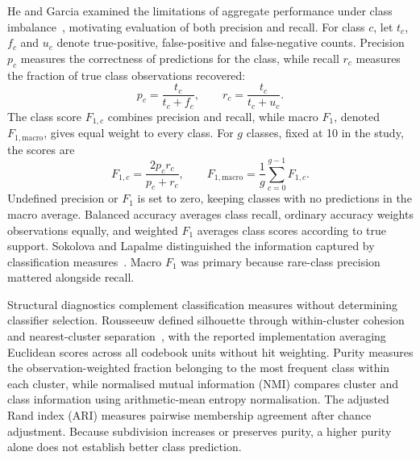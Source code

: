 He and Garcia examined the limitations of aggregate performance under class imbalance~\cite{he2009}, motivating evaluation of both precision and recall. For class $c$, let $t_c$, $f_c$ and $u_c$ denote true-positive, false-positive and false-negative counts. Precision $p_c$ measures the correctness of predictions for the class, while recall $r_c$ measures the fraction of true class observations recovered:
\begin{equation}
 p_c=\frac{t_c}{t_c+f_c},\qquad
 r_c=\frac{t_c}{t_c+u_c}.
\end{equation}
The class score $F_{1,c}$ combines precision and recall, while macro $F_1$, denoted $F_{1,\mathrm{macro}}$, gives equal weight to every class. For $g$ classes, fixed at 10 in the study, the scores are
\begin{equation}
 F_{1,c}=\frac{2p_cr_c}{p_c+r_c},\qquad
 F_{1,\mathrm{macro}}=\frac{1}{g}\sum_{c=0}^{g-1}F_{1,c}.
\end{equation}
Undefined precision or $F_1$ is set to zero, keeping classes with no predictions in the macro average. Balanced accuracy averages class recall, ordinary accuracy weights observations equally, and weighted $F_1$ averages class scores according to true support. Sokolova and Lapalme distinguished the information captured by classification measures~\cite{sokolova2009}. Macro $F_1$ was primary because rare-class precision mattered alongside recall.

Structural diagnostics complement classification measures without determining classifier selection. Rousseeuw defined silhouette through within-cluster cohesion and nearest-cluster separation~\cite{rousseeuw1987}, with the reported implementation averaging Euclidean scores across all codebook units without hit weighting. Purity measures the observation-weighted fraction belonging to the most frequent class within each cluster, while normalised mutual information (NMI) compares cluster and class information using arithmetic-mean entropy normalisation. The adjusted Rand index (ARI) measures pairwise membership agreement after chance adjustment. Because subdivision increases or preserves purity, a higher purity alone does not establish better class prediction.

